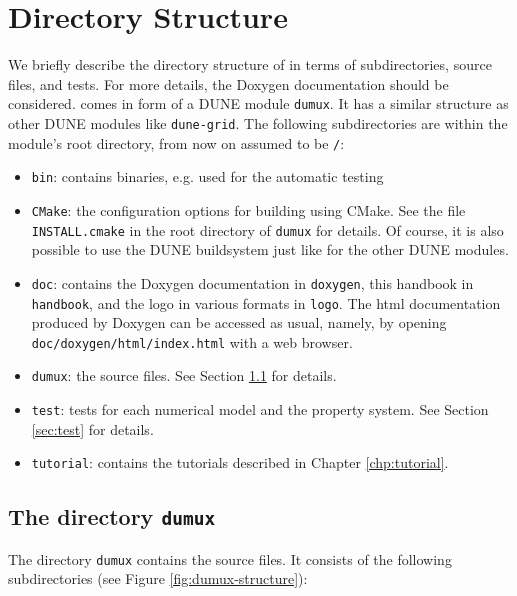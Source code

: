 \section{Directory Structure}
We briefly describe the directory structure of \Dumux in terms
of subdirectories, source files, and tests. For more details,
the Doxygen documentation should be considered.
\Dumux comes in form of a DUNE module \texttt{dumux}.
It has a similar structure as other DUNE modules like \texttt{dune-grid}.
The following subdirectories are within the module's root directory,
from now on assumed to be \texttt{/}:
\begin{itemize}
\item \texttt{bin}: contains binaries, e.g. used for the automatic testing
\item \texttt{CMake}: the configuration options
for building \Dumux using CMake. See the file \texttt{INSTALL.cmake} in
the root directory of \texttt{dumux} for details. Of course,
it is also possible to use the DUNE buildsystem just like for the other
DUNE modules.
\item \texttt{doc}: contains the Doxygen documentation in \texttt{doxygen},
this handbook in \texttt{handbook}, and the \Dumux logo in various formats in
\texttt{logo}. The html documentation produced by Doxygen can be accessed as usual,
namely, by opening \texttt{doc/doxygen/html/index.html} with a web browser.
\item \texttt{dumux}: the \Dumux source files. See Section \ref{sec:dumux} for details.
\item \texttt{test}: tests for each numerical model and the property system.
See Section \ref{sec:test} for details.
\item \texttt{tutorial}: contains the tutorials described in Chapter \ref{chp:tutorial}.
\end{itemize}


\subsection{The directory \texttt{dumux}}
\label{sec:dumux}

The directory \texttt{dumux} contains the \Dumux source files. It consists of the
following subdirectories (see Figure \ref{fig:dumux-structure}):


